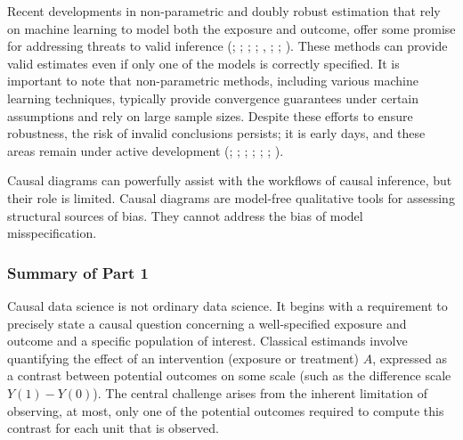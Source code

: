 \documentclass[
  singlecolumn,
  9pt]{article}
\begin{document}
Recent developments in non-parametric and doubly robust estimation that
rely on machine learning to model both the exposure and outcome, offer
some promise for addressing threats to valid inference
(;
;
;
;
,
; ; ). These
methods can provide valid estimates even if only one of the models is
correctly specified. It is important to note that non-parametric
methods, including various machine learning techniques, typically
provide convergence guarantees under certain assumptions and rely on
large sample sizes. Despite these efforts to ensure robustness, the risk
of invalid conclusions persists; it is early days, and these areas
remain under active development (; ;
;
;
;
;
).

Causal diagrams can powerfully assist with the workflows of causal
inference, but their role is limited. Causal diagrams are model-free
qualitative tools for assessing structural sources of bias. They cannot
address the bias of model misspecification.

\subsubsection{Summary of Part 1}\label{summary-of-part-1}

Causal data science is not ordinary data science. It begins with a
requirement to precisely state a causal question concerning a
well-specified exposure and outcome and a specific population of
interest. Classical estimands involve quantifying the effect of an
intervention (exposure or treatment) \(A\), expressed as a contrast
between potential outcomes on some scale (such as the difference scale
\(Y(1) - Y(0)\)). The central challenge arises from the inherent
limitation of observing, at most, only one of the potential outcomes
required to compute this contrast for each unit that is observed.
\end{document}
